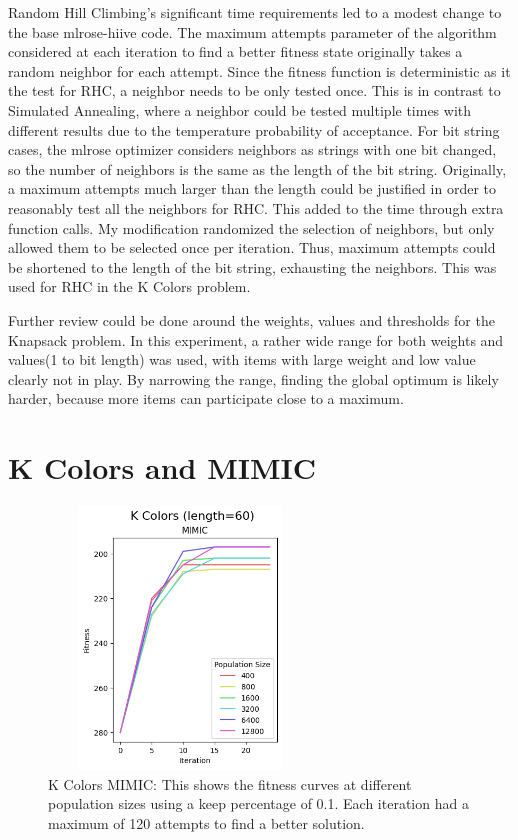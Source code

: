 \documentclass[letterpaper]{article} %
\begin{document}
Random Hill Climbing's significant time requirements led to a modest change to the base mlrose-hiive code.  The maximum attempts parameter of the algorithm considered at each iteration to find a better fitness state originally takes a random neighbor for each attempt.  Since the fitness function is deterministic as it the test for RHC, a neighbor needs to be only tested once.  This is in contrast to Simulated Annealing, where a neighbor could be tested multiple times with different results due to the temperature probability of acceptance.  For bit string cases, the mlrose optimizer considers neighbors as strings with one bit changed, so the number of neighbors is the same as the length of the bit string.  Originally, a maximum attempts much larger than the length could be justified in order to reasonably test all the neighbors for RHC.  This added to the time through extra function calls.  My modification randomized the selection of neighbors, but only allowed them to be selected once per iteration.  Thus, maximum attempts could be shortened to the length of the bit string, exhausting the neighbors.  This was used for RHC in the K Colors problem. 

Further review could be done around the weights, values and thresholds for the Knapsack problem.  In this experiment,  a rather wide range for both weights and values(1 to bit length) was used, with items with large weight and low value clearly not in play.  By narrowing the range, finding the global optimum is likely harder, because more items can participate close to a maximum.

\section{K Colors and MIMIC}

\begin{figure}[!htb]
\centering
\includegraphics[width=2.75in, height=2.75in]{figures/K_Colors_length=60_MIMIC_l_60_ma_120_p_400__800__1600__3200__6400__12800_k_0.1_.png}
\caption{K Colors MIMIC: This shows the fitness curves at different population sizes using a keep percentage of 0.1. Each iteration had a maximum of 120 attempts to find a better solution. }
\label{fig:kcolor_mimic}
\end{figure}
\end{document}
